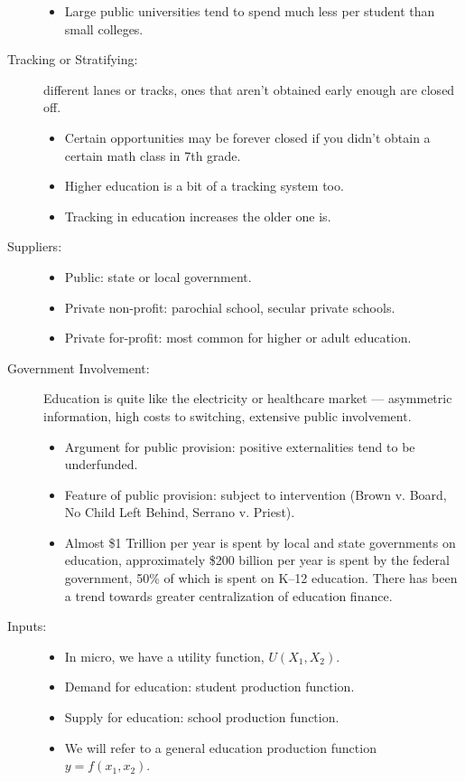 \documentclass[10pt]{extarticle}
\begin{document}
\begin{description}
      \begin{itemize}
        \item Large public universities tend to spend much less per student than small colleges.
      \end{itemize}
    \item[Tracking or Stratifying:] different lanes or tracks, ones that aren't obtained early enough are closed off.
      \begin{itemize}
        \item Certain opportunities may be forever closed if you didn't obtain a certain math class in 7th grade.
        \item Higher education is a bit of a tracking system too.
        \item Tracking in education increases the older one is.
      \end{itemize}
    \item[Suppliers:]\hfill
      \begin{itemize}
        \item Public: state or local government.
        \item Private non-profit: parochial school, secular private schools.
        \item Private for-profit: most common for higher or adult education.
      \end{itemize}
    \item[Government Involvement:] Education is quite like the electricity or healthcare market --- asymmetric information, high costs to switching, extensive public involvement.
      \begin{itemize}
        \item Argument for public provision: positive externalities tend to be underfunded.
        \item Feature of public provision: subject to intervention (Brown v. Board, No Child Left Behind, Serrano v. Priest).
        \item Almost \$1 Trillion per year is spent by local and state governments on education, approximately \$200 billion per year is spent by the federal government, 50\% of which is spent on K--12 education. There has been a trend towards greater centralization of education finance.
      \end{itemize}
    \item[Inputs:]\hfill
      \begin{itemize}
        \item In micro, we have a utility function, $U(X_1,X_2)$.
        \item Demand for education: student production function.
        \item Supply for education: school production function.
        \item We will refer to a general education production function $y = f(x_1,x_2)$.\\


\end{itemize}
\end{description}
\end{document}
